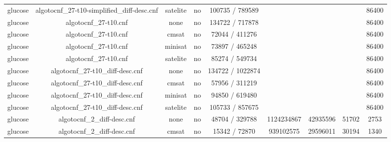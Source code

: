 \begin{appendices}
\begin{table}[p]
\begin{center}
\begin{tabular}{l|cccccccc}
  glucose                        & algotocnf\_27-t10-simplified\_diff-desc.cnf & satelite   & no    & 100735 / 789589 &           &           &            & 86400 \\ %
  glucose                        & algotocnf\_27-t10.cnf          & none       & no    & 134722 / 717878 &           &           &            & 86400 \\ %
  glucose                        & algotocnf\_27-t10.cnf          & cmsat      & no    & 72044 / 411276 &           &           &            & 86400 \\ %
  glucose                        & algotocnf\_27-t10.cnf          & minisat    & no    & 73897 / 465248 &           &           &            & 86400 \\ %
  glucose                        & algotocnf\_27-t10.cnf          & satelite   & no    & 85274 / 549734 &           &           &            & 86400 \\ %
  glucose                        & algotocnf\_27-t10\_diff-desc.cnf & none       & no    & 134722 / 1022874 &           &           &            & 86400 \\ %
  glucose                        & algotocnf\_27-t10\_diff-desc.cnf & cmsat      & no    & 57956 / 311219 &           &           &            & 86400 \\ %
  glucose                        & algotocnf\_27-t10\_diff-desc.cnf & minisat    & no    & 94850 / 619480 &           &           &            & 86400 \\ %
  glucose                        & algotocnf\_27-t10\_diff-desc.cnf & satelite   & no    & 105733 / 857675 &           &           &            & 86400 \\ %
  glucose                        & algotocnf\_2\_diff-desc.cnf    & none       & no    & 48704 / 329788 & 1124234867 & 42935596  & 51702      & 2753 \\ %
  glucose                        & algotocnf\_2\_diff-desc.cnf    & cmsat      & no    & 15342 / 72870 & 939102575 & 29596011  & 30194      & 1340 \\ %

\end{tabular}
\end{center}
\end{table}
\end{appendices}
